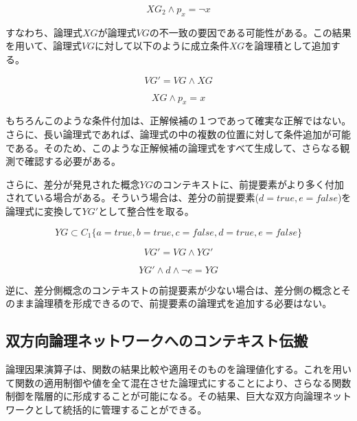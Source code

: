 \documentclass[12pt]{article}
\begin{document}
\begin{equation}  XG_{2} \wedge p_x = \neg x \end{equation}

すなわち、論理式\(XG\)が論理式\(VG\)の不一致の要因である可能性がある。この結果を用いて、論理式\(VG\)に対して以下のように成立条件\(XG\)を論理積として追加する。

\begin{equation}  VG' =  VG \wedge XG \end{equation}

\begin{equation} XG \wedge p_x = x \end{equation}

もちろんこのような条件付加は、正解候補の１つであって確実な正解ではない。さらに、長い論理式であれば、論理式の中の複数の位置に対して条件追加が可能である。そのため、このような正解候補の論理式をすべて生成して、さらなる観測で確認する必要がある。

さらに、差分が発見された概念\(YG\)のコンテキストに、前提要素がより多く付加されている場合がある。そういう場合は、差分の前提要素(\(d=true,e=false\))を論理式に変換して\(YG'\)として整合性を取る。

\begin{equation} YG \subset C_1\{a=true,b=true,c=false,d=true,e=false\}\end{equation}

\begin{equation} VG' = VG \wedge YG'\end{equation}

\begin{equation} YG' \wedge d \wedge \neg e = YG \end{equation}

逆に、差分側概念のコンテキストの前提要素が少ない場合は、差分側の概念とそのまま論理積を形成できるので、前提要素の論理式を追加する必要はない。

\subsection{双方向論理ネットワークへのコンテキスト伝搬}\label{ux53ccux65b9ux5411ux8ad6ux7406ux30cdux30c3ux30c8ux30efux30fcux30afux3078ux306eux30b3ux30f3ux30c6ux30adux30b9ux30c8ux4f1dux642c}

論理因果演算子は、関数の結果比較や適用そのものを論理値化する。これを用いて関数の適用制御や値を全て混在させた論理式にすることにより、さらなる関数制御を階層的に形成することが可能になる。その結果、巨大な双方向論理ネットワークとして統括的に管理することができる。
\end{document}
